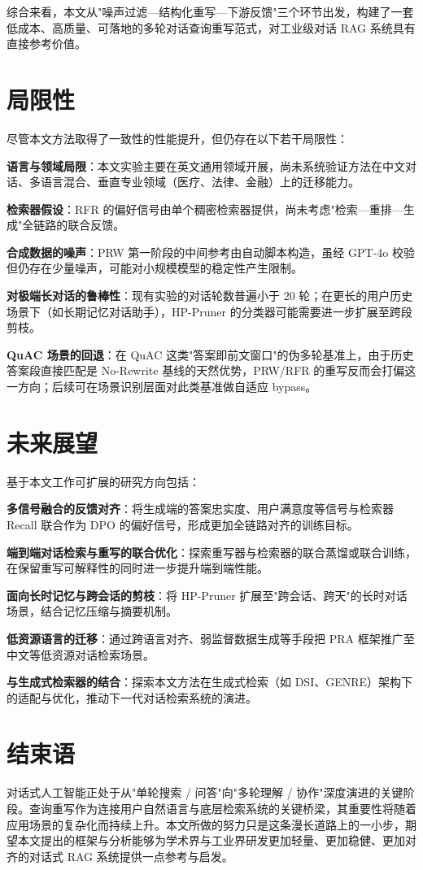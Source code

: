 综合来看，本文从"噪声过滤—结构化重写—下游反馈"三个环节出发，构建了一套低成本、高质量、可落地的多轮对话查询重写范式，对工业级对话 RAG 系统具有直接参考价值。

\section{局限性}

尽管本文方法取得了一致性的性能提升，但仍存在以下若干局限性：

\textbf{语言与领域局限}：本文实验主要在英文通用领域开展，尚未系统验证方法在中文对话、多语言混合、垂直专业领域（医疗、法律、金融）上的迁移能力。

\textbf{检索器假设}：RFR 的偏好信号由单个稠密检索器提供，尚未考虑"检索—重排—生成"全链路的联合反馈。

\textbf{合成数据的噪声}：PRW 第一阶段的中间参考由自动脚本构造，虽经 GPT-4o 校验但仍存在少量噪声，可能对小规模模型的稳定性产生限制。

\textbf{对极端长对话的鲁棒性}：现有实验的对话轮数普遍小于 20 轮；在更长的用户历史场景下（如长期记忆对话助手），HP-Pruner 的分类器可能需要进一步扩展至跨段剪枝。

\textbf{QuAC 场景的回退}：在 QuAC 这类"答案即前文窗口"的伪多轮基准上，由于历史答案段直接匹配是 No-Rewrite 基线的天然优势，PRW/RFR 的重写反而会打偏这一方向；后续可在场景识别层面对此类基准做自适应 bypass。

\section{未来展望}

基于本文工作可扩展的研究方向包括：

\textbf{多信号融合的反馈对齐}：将生成端的答案忠实度、用户满意度等信号与检索器 Recall 联合作为 DPO 的偏好信号，形成更加全链路对齐的训练目标。

\textbf{端到端对话检索与重写的联合优化}：探索重写器与检索器的联合蒸馏或联合训练，在保留重写可解释性的同时进一步提升端到端性能。

\textbf{面向长时记忆与跨会话的剪枝}：将 HP-Pruner 扩展至"跨会话、跨天"的长时对话场景，结合记忆压缩与摘要机制。

\textbf{低资源语言的迁移}：通过跨语言对齐、弱监督数据生成等手段把 PRA 框架推广至中文等低资源对话检索场景。

\textbf{与生成式检索器的结合}：探索本文方法在生成式检索（如 DSI、GENRE）架构下的适配与优化，推动下一代对话检索系统的演进。

\section{结束语}

对话式人工智能正处于从"单轮搜索 / 问答"向"多轮理解 / 协作"深度演进的关键阶段。查询重写作为连接用户自然语言与底层检索系统的关键桥梁，其重要性将随着应用场景的复杂化而持续上升。本文所做的努力只是这条漫长道路上的一小步，期望本文提出的框架与分析能够为学术界与工业界研发更加轻量、更加稳健、更加对齐的对话式 RAG 系统提供一点参考与启发。
